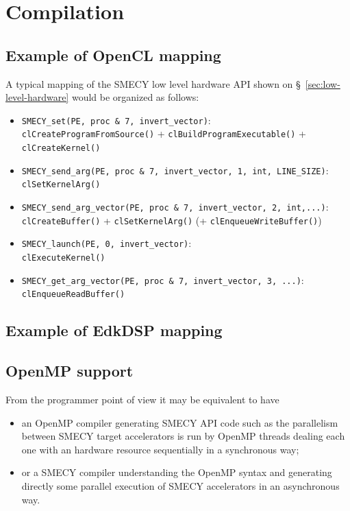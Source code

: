 \documentclass[a4paper]{article}
\begin{document}
\section{Compilation}
\label{sec:compilation}

\subsection{Example of OpenCL mapping}
\label{sec:example-opencl-mapp}

A typical mapping of the SMECY low level hardware API shown on
\S~\ref{sec:low-level-hardware} would be organized as follows:
\begin{itemize}
\item \verb|SMECY_set(PE, proc & 7, invert_vector)|:\\
  \texttt{clCreateProgramFromSource()} +
  \texttt{clBuildProgramExecutable()} + \texttt{clCreateKernel()}
\item \verb|SMECY_send_arg(PE, proc & 7, invert_vector, 1, int, LINE_SIZE)|:\\
  \texttt{clSetKernelArg()}
\item \verb|SMECY_send_arg_vector(PE, proc & 7, invert_vector, 2, int,...)|:\\
  \texttt{clCreateBuffer()} + \texttt{clSetKernelArg()} (+
  \texttt{clEnqueueWriteBuffer()})
\item \verb|SMECY_launch(PE, 0, invert_vector)|:\\
  \texttt{clExecuteKernel()}
\item \verb|SMECY_get_arg_vector(PE, proc & 7, invert_vector, 3, ...)|:\\
  \texttt{clEnqueueReadBuffer()}
\end{itemize}


\subsection{Example of EdkDSP mapping}
\label{sec:example-edkdsp-mapp}


\subsection{OpenMP support}
\label{sec:openmp-support-1}

From the programmer point of view it may be equivalent to have
\begin{itemize}
\item an OpenMP compiler generating SMECY API code such as the parallelism
  between SMECY target accelerators is run by OpenMP threads dealing each
  one with an hardware resource sequentially in a synchronous way;
\item or a SMECY compiler understanding the OpenMP syntax and generating
  directly some parallel execution of SMECY accelerators in an
  asynchronous way.
\end{itemize}
\end{document}
